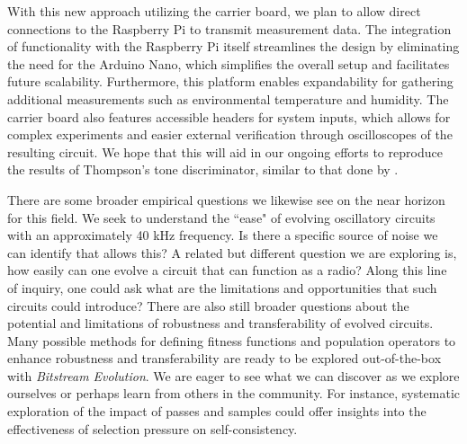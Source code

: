 \documentclass{ieeeaccess}
\begin{document}
With this new approach utilizing the carrier board, we plan to allow direct connections to the Raspberry Pi to transmit measurement data. The integration of functionality with the Raspberry Pi itself streamlines the design by eliminating the need for the Arduino Nano, which simplifies the overall setup and facilitates future scalability. Furthermore, this platform enables expandability for gathering additional measurements such as environmental temperature and humidity. The carrier board also features accessible headers for system inputs, which allows for complex experiments and easier external verification through oscilloscopes of the resulting circuit. We hope that this will aid in our ongoing efforts to reproduce the results of Thompson's tone discriminator, similar to that done by \cite{Hoffmann2022CoBEA}.



 



There are some broader empirical questions we likewise see on the near horizon for this field. We seek to understand the ``ease" of evolving oscillatory circuits with an approximately 40 kHz frequency. Is there a specific source of noise we can identify that allows this? A related but different question we are exploring is, how easily can one evolve a circuit that can function as a radio? Along this line of inquiry, one could ask what are the limitations and opportunities that such circuits could introduce? There are also still broader questions about the potential and limitations of robustness and transferability of evolved circuits. Many possible methods for defining fitness functions and population operators to enhance robustness and transferability are ready to be explored out-of-the-box with \textit{Bitstream Evolution}. We are eager to see what we can discover as we explore ourselves or perhaps learn from others in the community. For instance, systematic exploration of the impact of passes and samples could offer insights into the effectiveness of selection pressure on self-consistency. 
\end{document}
